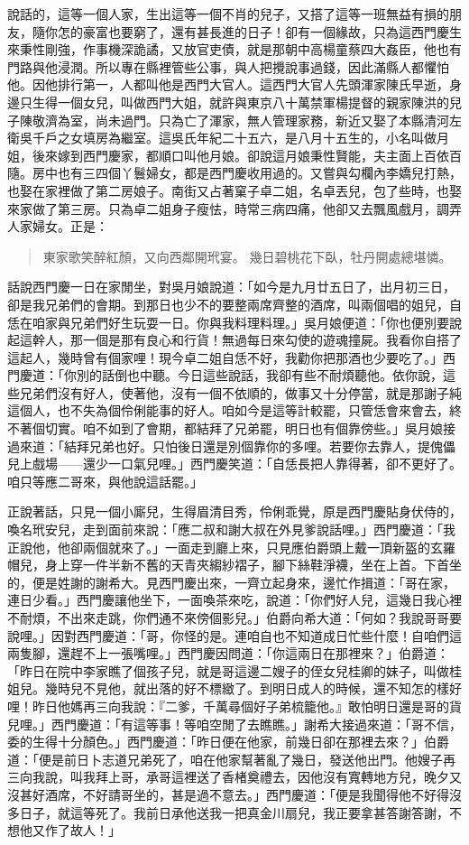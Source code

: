 說話的，這等一個人家，生出這等一個不肖的兒子，又搭了這等一班無益有損的朋友，隨你怎的豪富也要窮了，還有甚長進的日子！卻有一個緣故，只為這西門慶生來秉性剛強，作事機深詭譎，又放官吏債，就是那朝中高楊童蔡四大姦臣，他也有門路與他浸潤。所以專在縣裡管些公事，與人把攪說事過錢，因此滿縣人都懼怕他。因他排行第一，人都叫他是西門大官人。這西門大官人先頭渾家陳氏早逝，身邊只生得一個女兒，叫做西門大姐，就許與東京八十萬禁軍楊提督的親家陳洪的兒子陳敬濟為室，尚未過門。只為亡了渾家，無人管理家務，新近又娶了本縣清河左衛吳千戶之女填房為繼室。這吳氏年紀二十五六，是八月十五生的，小名叫做月姐，後來嫁到西門慶家，都順口叫他月娘。卻說這月娘秉性賢能，夫主面上百依百隨。房中也有三四個丫鬟婦女，都是西門慶收用過的。又嘗與勾欄內李嬌兒打熱，也娶在家裡做了第二房娘子。南街又占著窠子卓二姐，名卓丟兒，包了些時，也娶來家做了第三房。只為卓二姐身子瘦怯，時常三病四痛，他卻又去飄風戲月，調弄人家婦女。正是：
\begin{quote}
東家歌笑醉紅顏，又向西鄰開玳宴。
幾日碧桃花下臥，牡丹開處總堪憐。
\end{quote}

話說西門慶一日在家閒坐，對吳月娘說道：「如今是九月廿五日了，出月初三日，卻是我兄弟們的會期。到那日也少不的要整兩席齊整的酒席，叫兩個唱的姐兒，自恁在咱家與兄弟們好生玩耍一日。你與我料理料理。」吳月娘便道：「你也便別要說起這幹人，那一個是那有良心和行貨！無過每日來勾使的遊魂撞屍。我看你自搭了這起人，幾時曾有個家哩！現今卓二姐自恁不好，我勸你把那酒也少要吃了。」西門慶道：「你別的話倒也中聽。今日這些說話，我卻有些不耐煩聽他。依你說，這些兄弟們沒有好人，使著他，沒有一個不依順的，做事又十分停當，就是那謝子純這個人，也不失為個伶俐能事的好人。咱如今是這等計較罷，只管恁會來會去，終不著個切實。咱不如到了會期，都結拜了兄弟罷，明日也有個靠傍些。」吳月娘接過來道：「結拜兄弟也好。只怕後日還是別個靠你的多哩。若要你去靠人，提傀儡兒上戲場——還少一口氣兒哩。」西門慶笑道：「自恁長把人靠得著，卻不更好了。咱只等應二哥來，與他說這話罷。」

正說著話，只見一個小廝兒，生得眉清目秀，伶俐乖覺，原是西門慶貼身伏侍的，喚名玳安兒，走到面前來說：「應二叔和謝大叔在外見爹說話哩。」西門慶道：「我正說他，他卻兩個就來了。」一面走到廳上來，只見應伯爵頭上戴一頂新盔的玄羅帽兒，身上穿一件半新不舊的天青夾縐紗褶子，腳下絲鞋淨襪，坐在上首。下首坐的，便是姓謝的謝希大。見西門慶出來，一齊立起身來，邊忙作揖道：「哥在家，連日少看。」西門慶讓他坐下，一面喚茶來吃，說道：「你們好人兒，這幾日我心裡不耐煩，不出來走跳，你們通不來傍個影兒。」伯爵向希大道：「何如？我說哥哥要說哩。」因對西門慶道：「哥，你怪的是。連咱自也不知道成日忙些什麼！自咱們這兩隻腳，還趕不上一張嘴哩。」西門慶因問道：「你這兩日在那裡來？」伯爵道：「昨日在院中李家瞧了個孩子兒，就是哥這邊二嫂子的侄女兒桂卿的妹子，叫做桂姐兒。幾時兒不見他，就出落的好不標緻了。到明日成人的時候，還不知怎的樣好哩！昨日他媽再三向我說：『二爹，千萬尋個好子弟梳籠他。』敢怕明日還是哥的貨兒哩。」西門慶道：「有這等事！等咱空閒了去瞧瞧。」謝希大接過來道：「哥不信，委的生得十分顏色。」西門慶道：「昨日便在他家，前幾日卻在那裡去來？」伯爵道：「便是前日卜志道兄弟死了，咱在他家幫著亂了幾日，發送他出門。他嫂子再三向我說，叫我拜上哥，承哥這裡送了香楮奠禮去，因他沒有寬轉地方兒，晚夕又沒甚好酒席，不好請哥坐的，甚是過不意去。」西門慶道：「便是我聞得他不好得沒多日子，就這等死了。我前日承他送我一把真金川扇兒，我正要拿甚答謝答謝，不想他又作了故人！」

